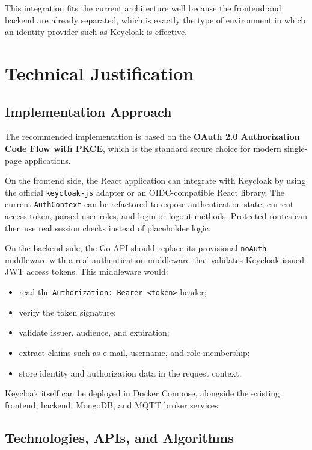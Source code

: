 \documentclass[conference]{IEEEtran}
\begin{document}
This integration fits the current architecture well because the frontend and backend are already separated, which is exactly the type of environment in which an identity provider such as Keycloak is effective.

\section{Technical Justification}

\subsection{Implementation Approach}

The recommended implementation is based on the \textbf{OAuth 2.0 Authorization Code Flow with PKCE}, which is the standard secure choice for modern single-page applications.

On the frontend side, the React application can integrate with Keycloak by using the official \texttt{keycloak-js} adapter or an OIDC-compatible React library. The current \texttt{AuthContext} can be refactored to expose authentication state, current access token, parsed user roles, and login or logout methods. Protected routes can then use real session checks instead of placeholder logic.

On the backend side, the Go API should replace its provisional \texttt{noAuth} middleware with a real authentication middleware that validates Keycloak-issued JWT access tokens. This middleware would:

\begin{itemize}
\item read the \texttt{Authorization: Bearer <token>} header;
\item verify the token signature;
\item validate issuer, audience, and expiration;
\item extract claims such as e-mail, username, and role membership;
\item store identity and authorization data in the request context.
\end{itemize}

Keycloak itself can be deployed in Docker Compose, alongside the existing frontend, backend, MongoDB, and MQTT broker services.

\subsection{Technologies, APIs, and Algorithms}
\end{document}

